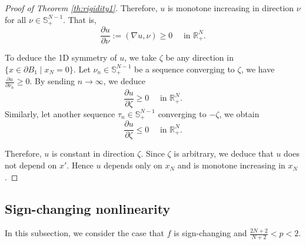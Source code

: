 \documentclass[reqno]{amsart}
\theoremstyle{plain}
\theoremstyle{definition}
\theoremstyle{remark}
\begin{document}
\begin{proof}[Proof of Theorem \ref{th:rigidity1}]
		Therefore, $u$ is monotone increasing in direction $\nu$ for all $\nu\in \mathbb{S}^{N-1}_+$. That is,
		\[
		\frac{\partial u}{\partial \nu} := (\nabla u, \nu) \ge 0 \quad \text{ in } \mathbb{R}^N_+.
		\]
		
		To deduce the 1D symmetry of $u$, we take $\zeta$ be any direction in $\{x\in \partial B_1 \mid x_N=0\}$. Let $\nu_n\in \mathbb{S}^{N-1}_+$ be a sequence converging to $\zeta$, we have $\frac{\partial u}{\partial \nu_n} \ge 0$. By sending $n\to\infty$, we deduce
		\[
		\frac{\partial u}{\partial\zeta} \ge 0 \quad \text{ in } \mathbb{R}^N_+.
		\]
		Similarly, let another sequence $\tau_n\in \mathbb{S}^{N-1}_+$ converging to $-\zeta$, we obtain
		\[
		\frac{\partial u}{\partial\zeta} \le 0 \quad \text{ in } \mathbb{R}^N_+.
		\]
		
		Therefore, $u$ is constant in direction $\zeta$. Since $\zeta$ is arbitrary, we deduce that $u$ does not depend on $x'$. Hence $u$ depends only on $x_N$ and is monotone increasing in $x_N$.
	\end{proof}
	
	\subsection{Sign-changing nonlinearity}
	In this subsection, we consider the case that $f$ is sign-changing and $\frac{2N+2}{N+2}<p<2$.
	
\end{document}
